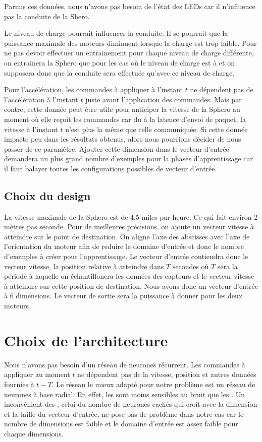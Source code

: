 \documentclass[12pt,a4paper,oneside, titlepage]{article}
\begin{document}
Parmis ces données, nous n'avons pas besoin de l'état des LEDs car il n'influence pas la conduite de la Shero.

Le niveau de charge pourrait influencer la conduite.
Il se pourrait que la puissance maximale des moteurs diminuent lorsque la charge est trop faible.
Pour ne pas devoir effectuer un entrainement pour chaque niveau de charge différente, on entrainera la Sphero que pour les cas où le niveau de charge est à  et on supposera donc que la conduite sera effectuée qu'avec ce niveau de charge.

Pour l'accélération, les commandes à appliquer à l'instant $t$ ne dépendent pas de l'accélération à l'instant $t$ juste avant l'application des commandes.
Mais par contre, cette donnée peut être utile pour anticiper la vitesse de la Sphero au moment où elle reçoit les commandes car du à la latence d'envoi de paquet, la vitesse à l'instant $t$ n'est plus la même que celle communiquée.
Si cette donnée impacte peu dans les résultats obtenus, alors nous pourrions décider de nous passer de ce paramètre.
Ajouter cette dimension dans le vecteur d'entrée demandera un plus grand nombre d'exemples pour la phases d'apprentissage car il faut balayer toutes les configurations possibles de vecteur d'entrée.

\subsection{Choix du design}

La vitesse maximale de la Sphero est de 4,5 miles par heure\cite{product}.
Ce qui fait environ 2 mètres pas seconde.
Pour de meilleures précisions, on ajoute un vecteur vitesse à atteindre sur le point de destination.
On aligne l'axe des abscisses avec l'axe de l'orientation du moteur afin de reduire le domaine d'entrée et donc le nombre d'exemples à créer pour l'apprentissage.
Le vecteur d'entrée contiendra donc le vecteur vitesse, la position relative à atteindre dans $T$ secondes où $T$ sera la période à laquelle on échantillonera les données des capteurs et le vecteur vitesse à atteindre sur cette position de destination.
Nous avons donc un vecteur d'entrée à 6 dimensions.
Le vecteur de sortie sera la puissance à donner pour les deux moteurs.

\section{Choix de l'architecture}
Nous n'avons pas besoin d'un réseau de neurones récurrent. Les commandes à appliquer au moment $t$ ne dépendent pas de la vitesse, position et autres données fournies à $t-T$.
Le réseau le mieux adapté pour notre problème est un réseau de neurones à base radial.
En effet, les \rbf sont moins sensibles au bruit que les \mlp \cite{adversarial,Gauthier}.%
Un inconvénient des \rbf, celui du nombre de neurones cachés qui croît avec la dimension et la taille du vecteur d'entrée, ne pose pas de problème dans notre cas
car le nombre de dimensions est faible
et le domaine d'entrée est assez faible pour chaque dimensions.
\end{document}
